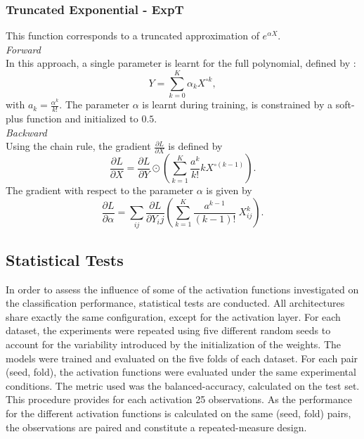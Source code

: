 \documentclass[11pt,a4paper]{article}
\begin{document}
\subsubsection{Truncated Exponential - ExpT}
This function corresponds to a truncated approximation of $e^{\alpha X}$. \\
\noindent \textit{Forward} \\
In this approach, a single parameter is learnt for the full polynomial, defined by : \[Y =\sum_{k=0}^K \alpha_k X^{\circ k}, \] with $a_k= \frac{\alpha^k}{k!}$.
The parameter $\alpha$ is learnt during training, is constrained by a soft-plus function and initialized to $0.5$. \\

\noindent \textit{Backward} \\
Using the chain rule, the gradient $\frac{\partial L}{ \partial X}$ is defined by \[ \frac{\partial L}{\partial X} = \frac{\partial L}{\partial Y} \odot \left( \sum_{k=1}^K \frac{a^k}{k!} k X^{\circ (k-1)} \right).\]
The gradient with respect to the parameter $\alpha$ is given by \[ \frac{\partial L}{\partial \alpha} = \sum_{ij}\frac{\partial L}{\partial Y_ij}\left(  \sum_{k=1}^K \frac{a^{k-1}}{(k-1)!}\: X_{ij}^k \right) .\]

\subsection{Statistical Tests}
In order to assess the influence of some of the activation functions investigated on the classification performance, statistical tests are conducted. All architectures share exactly the same configuration, except for the activation layer. For each dataset, the experiments were repeated using five different random seeds to account for the variability introduced by the initialization of the weights. The models were trained and evaluated on the five folds of each dataset. For each pair (seed, fold), the activation functions were evaluated under the same experimental conditions. The metric used was the balanced-accuracy, calculated on the test set. 
This procedure provides for each activation 25 observations. As the performance for the different activation functions is calculated on the same (seed, fold) pairs, the observations are paired and constitute a repeated-measure design. \\
\end{document}
